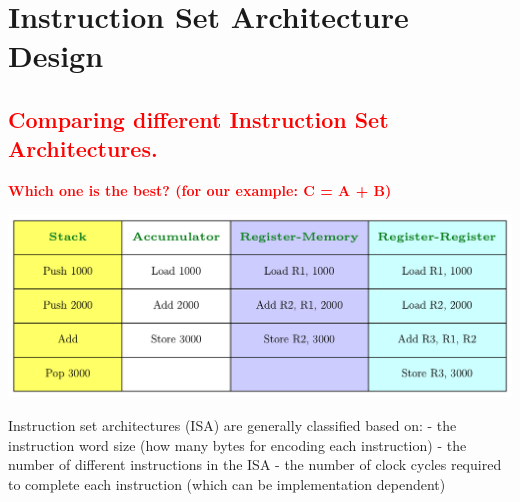 \documentclass[
  14pt,
  a4paper,
  DIV=11,
  numbers=noendperiod,
  headinclude=true,
  footinclude=true]{scrreprt}
\begin{document}
\chapter{Instruction Set Architecture
Design}\label{instruction-set-architecture-design}

\section{\texorpdfstring{\textcolor{red}{Comparing different Instruction
Set
Architectures.}}{Comparing different Instruction Set Architectures.}}\label{comparing-different-instruction-set-architectures.}

\textcolor{red}{\textbf{Which one is the best? (for our example: C = A +
B)}}

\begin{center}
\includegraphics{lecture1-3/04-ISA-design_files/figure-pdf/isa-table-output-1.pdf}
\end{center}

\begin{tcolorbox}[colback=boxbodycol, colframe=boxheadcol, coltitle=boxtitlecol, colbacktitle=boxheadcol, title=Basic ISA Classes]
Instruction set architectures (ISA) are generally classified based on: -
the instruction word size (how many bytes for encoding each instruction)
- the number of different instructions in the ISA - the number of clock
cycles required to complete each instruction (which can be
implementation dependent)

\end{tcolorbox}
\end{document}

